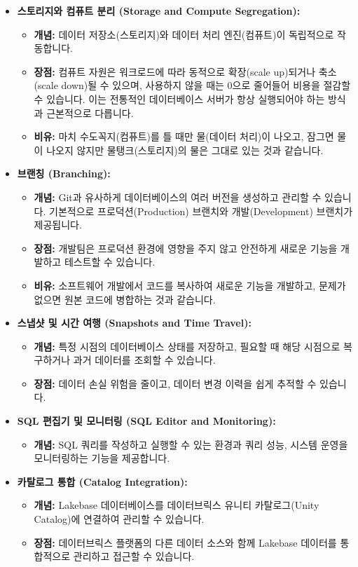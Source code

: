 \documentclass[11pt,a4paper]{article}
\theoremstyle{definition}
\begin{document}
\begin{itemize}
    \item \textbf{스토리지와 컴퓨트 분리 (Storage and Compute Segregation):}
    \begin{itemize}
        \item \textbf{개념:} 데이터 저장소(스토리지)와 데이터 처리 엔진(컴퓨트)이 독립적으로 작동합니다.
        \item \textbf{장점:} 컴퓨트 자원은 워크로드에 따라 동적으로 확장(scale up)되거나 축소(scale down)될 수 있으며, 사용하지 않을 때는 0으로 줄어들어 비용을 절감할 수 있습니다. 이는 전통적인 데이터베이스 서버가 항상 실행되어야 하는 방식과 근본적으로 다릅니다.
        \item \textbf{비유:} 마치 수도꼭지(컴퓨트)를 틀 때만 물(데이터 처리)이 나오고, 잠그면 물이 나오지 않지만 물탱크(스토리지)의 물은 그대로 있는 것과 같습니다.
    \end{itemize}
    \item \textbf{브랜칭 (Branching):}
    \begin{itemize}
        \item \textbf{개념:} Git과 유사하게 데이터베이스의 여러 버전을 생성하고 관리할 수 있습니다. 기본적으로 프로덕션(Production) 브랜치와 개발(Development) 브랜치가 제공됩니다.
        \item \textbf{장점:} 개발팀은 프로덕션 환경에 영향을 주지 않고 안전하게 새로운 기능을 개발하고 테스트할 수 있습니다.
        \item \textbf{비유:} 소프트웨어 개발에서 코드를 복사하여 새로운 기능을 개발하고, 문제가 없으면 원본 코드에 병합하는 것과 같습니다.
    \end{itemize}
    \item \textbf{스냅샷 및 시간 여행 (Snapshots and Time Travel):}
    \begin{itemize}
        \item \textbf{개념:} 특정 시점의 데이터베이스 상태를 저장하고, 필요할 때 해당 시점으로 복구하거나 과거 데이터를 조회할 수 있습니다.
        \item \textbf{장점:} 데이터 손실 위험을 줄이고, 데이터 변경 이력을 쉽게 추적할 수 있습니다.
    \end{itemize}
    \item \textbf{SQL 편집기 및 모니터링 (SQL Editor and Monitoring):}
    \begin{itemize}
        \item \textbf{개념:} SQL 쿼리를 작성하고 실행할 수 있는 환경과 쿼리 성능, 시스템 운영을 모니터링하는 기능을 제공합니다.
    \end{itemize}
    \item \textbf{카탈로그 통합 (Catalog Integration):}
    \begin{itemize}
        \item \textbf{개념:} Lakebase 데이터베이스를 데이터브릭스 유니티 카탈로그(Unity Catalog)에 연결하여 관리할 수 있습니다.
        \item \textbf{장점:} 데이터브릭스 플랫폼의 다른 데이터 소스와 함께 Lakebase 데이터를 통합적으로 관리하고 접근할 수 있습니다.
    \end{itemize}
\end{itemize}
\end{document}
